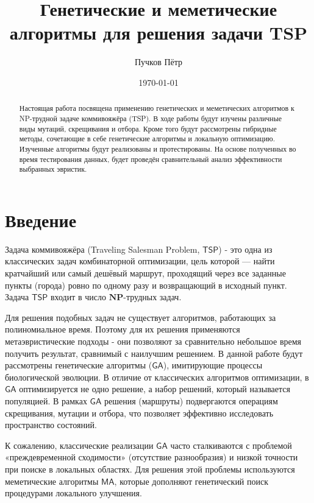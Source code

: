 \documentclass[a4paper,12pt]{article}
\begin{document}
\title{Генетические и меметические алгоритмы для решения задачи TSP}
\author{Пучков Пётр}
\date{\today}
\maketitle

\begin{abstract}
Настоящая работа посвящена применению генетических и меметических алгоритмов к NP-трудной задаче коммивояжёра (TSP). В ходе работы будут изучены различные виды мутаций, скрещивания и отбора. Кроме того будут рассмотрены гибридные методы, сочетающие в себе генетические алгоритмы и локальную оптимизацию. Изученные алгоритмы будут реализованы и протестированы. На основе полученных во время тестирования данных, будет проведён сравнительный анализ эффективности выбранных эвристик.

\end{abstract}

\pagebreak

\tableofcontents
\newpage

\section{Введение}

Задача коммивояжёра (Traveling Salesman Problem, $\mathsf{TSP}$) - это одна из классических задач комбинаторной оптимизации, цель которой — найти кратчайший или самый дешёвый маршрут, проходящий через все заданные пункты (города) ровно по одному разу и возвращающий в исходный пункт. Задача $\mathsf{TSP}$ входит в число $\mathbf{NP}$-трудных задач.

Для решения подобных задач не существует алгоритмов, работающих за полиномиальное время. Поэтому для их решения применяются метаэвристические подходы - они позволяют за сравнительно небольшое время получить результат, сравнимый с наилучшим решением. В данной работе будут рассмотрены генетические алгоритмы ($\mathsf{GA}$), имитирующие процессы биологической эволюции. В отличие от классических алгоритмов оптимизации, в $\mathsf{GA}$ оптимизируется не одно решение, а набор решений, который называется популяцией. В рамках $\mathsf{GA}$ решения (маршруты) подвергаются операциям скрещивания, мутации и отбора, что позволяет эффективно исследовать пространство состояний.

К сожалению, классические реализации $\mathsf{GA}$ часто сталкиваются с проблемой «преждевременной сходимости» (отсутствие разнообразия) и низкой точности при поиске в локальных областях. Для решения этой проблемы используются меметические алгоритмы $\mathsf{MA}$, которые дополняют генетический поиск процедурами локального улучшения.
\end{document}
